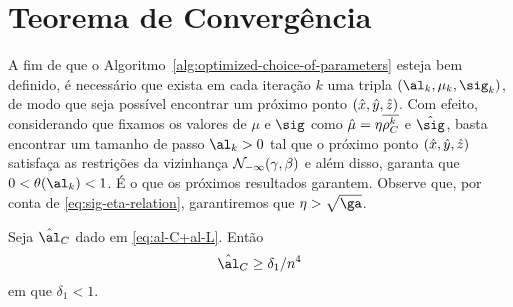\section{Teorema de Convergência}

A fim de que o Algoritmo~\ref{alg:optimized-choice-of-parameters} esteja bem definido, é necessário que exista em cada iteração $k$ uma tripla $(\al_k,\mu_k,\sig_k)$, de modo que seja possível encontrar um próximo ponto $(\hat{x},\hat{y},\hat{z})$. Com efeito, considerando que fixamos os valores de $\mu$ e $\sig$ como $\hat{\mu} = \eta\overline{\rho_C^{k}}$ e  $\nextsig$, basta encontrar um  tamanho de passo ${\al_k}>0$ tal que o próximo ponto $(\hat{x},\hat{y},\hat{z})$ satisfaça as restrições da vizinhança 
$\mathcal{N}_{-\infty}(\gamma,\beta)$ e além disso, garanta que  $0 < \theta(\al_k) <1$. É o que os próximos resultados garantem. Observe que, por conta de \eqref{eq:sig-eta-relation}, garantiremos que $\eta>\sqrt{\ga}$.



\begin{lema}\label{lemma:alC_delta-1}
Seja $\nextal_{C}$ dado em \eqref{eq:al-C+al-L}. Então 
\[
\nextal_{C} \geq \delta_{1}/n^{4}
\]
em que $\delta_{1} <1$.
\end{lema}

